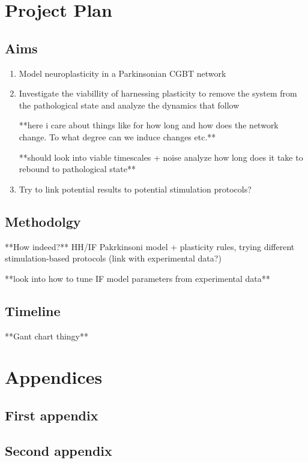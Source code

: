 \section{Project Plan}


\subsection{Aims}
\begin{enumerate}
	\item Model neuroplasticity in a Parkinsonian CGBT network
	\item Investigate the viabillity of harnessing plasticity to remove the
	      system from the pathological state and analyze the dynamics that follow

	      **here i care about things like for how long and how does the network change.
	      To what degree can we induce changes etc.**

	      **should look into viable timescales + noise analyze how long does it take to rebound to
	      pathological state**
	\item Try to link potential results to potential stimulation protocols?
\end{enumerate}

\subsection{Methodolgy} **How indeed?** HH/IF Pakrkinsoni model + plasticity rules, trying
different stimulation-based protocols (link with experimental data?)

**look into how to tune IF model parameters from experimental data**

\subsection{Timeline}
**Gant chart thingy**



\newpage


\newpage

\appendix
\section*{Appendices}
\renewcommand{\thesubsection}{\Alph{subsection}}
\subsection{First appendix}
\subsection{Second appendix}


